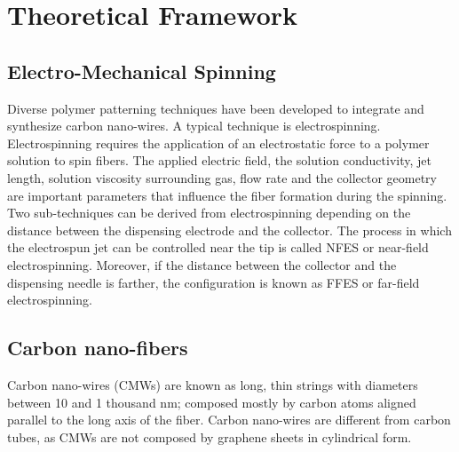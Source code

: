 
\chapter{Theoretical Framework} %

\label{Chapter:TheoreticalFramework}


\section{Electro-Mechanical Spinning}
Diverse polymer patterning techniques have been developed to integrate and synthesize carbon nano-wires. A typical technique is electrospinning. Electrospinning requires the application of an electrostatic force to a polymer solution to spin fibers. The applied electric field, the solution conductivity, jet length, solution viscosity surrounding gas, flow rate and the collector geometry are important parameters that influence the fiber formation during the spinning. \cite{Nataraj2012} Two sub-techniques can be derived from electrospinning depending on the distance between the dispensing electrode and the collector. The process in which the electrospun jet can be controlled near the
tip is called NFES or near-field electrospinning. \cite{Cisquella-Serra2019} Moreover, if the distance between the collector and the dispensing needle is farther, the configuration is known as FFES or far-field electrospinning. \cite{Nataraj2012}

\section{Carbon nano-fibers}
Carbon nano-wires (CMWs) are known as long, thin strings with diameters between 10 and 1 thousand nm; composed mostly by carbon atoms aligned parallel to the long axis of the fiber. \cite{Nataraj2012} Carbon nano-wires are different from carbon tubes, as CMWs are not composed by graphene sheets in cylindrical form. \cite{Nataraj2012}






